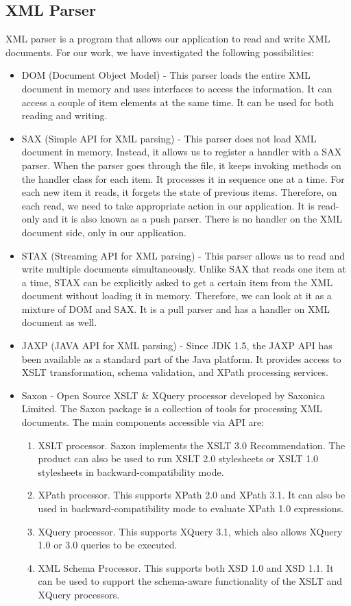 \subsection{XML Parser}
XML parser is a program that allows our application to read and write XML documents. For our work, we have investigated the following possibilities:
\begin{itemize}
	\item DOM (Document Object Model) - This parser loads the entire XML document in memory and uses interfaces to access the information. It can access a couple of item elements at the same time. It can be used for both reading and writing.
	\item SAX (Simple API for XML parsing) - This parser does not load XML document in memory. Instead, it allows us to register a handler with a SAX parser. When the parser goes through the file, it keeps invoking methods on the handler class for each item. It processes it in sequence one at a time. For each new item it reads, it forgets the state of previous items. Therefore, on each read, we need to take appropriate action in our application. It is read-only and it is also known as a push parser. There is no handler on the XML document side, only in our application.
	\item STAX (Streaming API for XML parsing) - This parser allows us to read and write multiple documents simultaneously. Unlike SAX that reads one item at a time, STAX can be explicitly asked to get a certain item from the XML document without loading it in memory. Therefore, we can look at it as a mixture of DOM and SAX. It is a pull parser and has a handler on XML document as well.
	\item JAXP (JAVA API for XML parsing) - Since JDK 1.5, the JAXP API has been available as a standard part of the Java platform. It provides access to XSLT transformation, schema validation, and XPath processing services.
	\item Saxon \cite{Saxon} - Open Source XSLT \& XQuery processor developed by Saxonica Limited. The Saxon package is a collection of tools for processing XML documents. The main components accessible via API are:
	\begin{enumerate}
		\item XSLT processor. Saxon implements the XSLT 3.0 Recommendation. The product can also be used to run XSLT 2.0 stylesheets or XSLT 1.0 stylesheets in backward-compatibility mode.
		\item XPath processor. This supports XPath 2.0 and XPath 3.1. It can also be used in backward-compatibility mode to evaluate XPath 1.0 expressions.
		\item XQuery processor. This supports XQuery 3.1, which also allows XQuery 1.0 or 3.0 queries to be executed. 
		\item XML Schema Processor. This supports both XSD 1.0 and XSD 1.1. It can be used to support the schema-aware functionality of the XSLT and XQuery processors.
	\end{enumerate}
\end{itemize}

